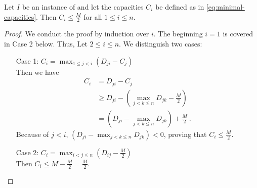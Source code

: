 \begin{lemma}
	Let $I$ be an instance of \RRL and let the capacities $C_i$ be defined as in \cref{eq:minimal-capacities}.
	Then $C_i \leq \frac{M}{2}$ for all $1 \leq i \leq n$.
\end{lemma}
\begin{proof}
	We conduct the proof by induction over $i$. 
	The beginning $i=1$ is covered in Case 2 below. 
	Thus, Let $2 \leq i \leq n$.
	We distinguish two cases:
	\begin{enumerate}[align=left]
		\item[Case 1: $C_i = \max_{1 \leq j < i}(D_{ji} - C_j)$]{\mbox{}\\
			Then we have
			\begin{align}
				C_i &= D_{ji} - C_j \\
				&\geq D_{ji} - (\max_{j < k \leq n} D_{jk} - \frac{M}{2})\\
				&= (D_{ji} - \max_{j < k \leq n} D_{jk}) + \frac{M}{2} \ .
			\end{align}
			Because of $j < i$, $(D_{ji} - \max_{j < k \leq n} D_{jk}) < 0$, proving that $C_i \leq \frac{M}{2}$.
		}
		\item[Case 2: $C_i = \max_{i < j \leq n}(D_{ij} - \frac{M}{2})$]{\mbox{}\\
			Then $C_i \leq M - \frac{M}{2} = \frac{M}{2}$.
		}
	\end{enumerate}
\end{proof}

